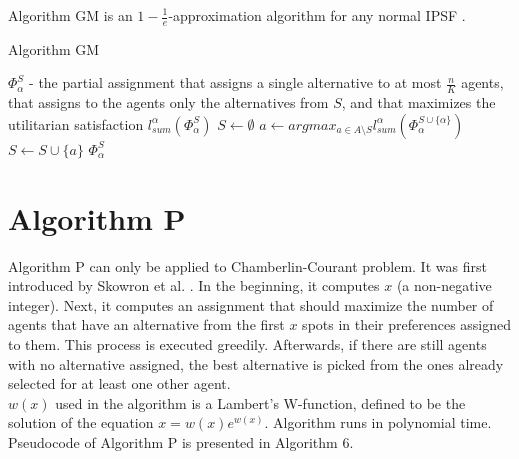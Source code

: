 Algorithm GM is an $1-\frac{1}{e}$-approximation algorithm for any normal IPSF \cite{1,5}.

\begin{algorithm}
\caption{Algorithm GM}\label{euclid}
\begin{algorithmic}[1]
		\State $\Phi^{S}_{\alpha}$ - the partial assignment that assigns a single alternative to at most $\frac{n}{K}$ agents, that assigns to the agents only the alternatives from $S$, and that maximizes the utilitarian satisfaction $l^{\alpha}_{sum}(\Phi^{S}_{\alpha})$
		\State $S \gets \emptyset$
			\State $a \gets argmax_{a \in A \setminus S} l^{\alpha}_{sum} (\Phi^{S \cup \{\alpha\}}_{\alpha})$
			\State $S \gets S \cup \{a\}$
		\EndFor
		\State \Return $\Phi^{S}_{\alpha}$
	\EndProcedure
\end{algorithmic}
\end{algorithm}

\section{Algorithm P}

Algorithm P can only be applied to Chamberlin-Courant problem. It was first introduced by Skowron et al. \cite{1}. In the beginning, it computes $x$ (a non-negative integer). Next, it computes an assignment that should maximize the number of agents that have an alternative from the first $x$ spots in their preferences assigned to them. This process is executed greedily. Afterwards, if there are still agents with no alternative assigned, the best alternative is picked from the ones already selected for at least one other agent.
\\

$w(x)$ used in the algorithm is a Lambert's W-function, defined to be the solution of the equation $x = w(x)e^{w(x)}$. Algorithm runs in polynomial time. Pseudocode of Algorithm P is presented in Algorithm 6.

